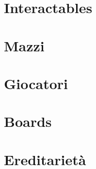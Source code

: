 \section{Interactables}

\section{Mazzi}

\section{Giocatori}

\section{Boards}

\section{Ereditarietà}





